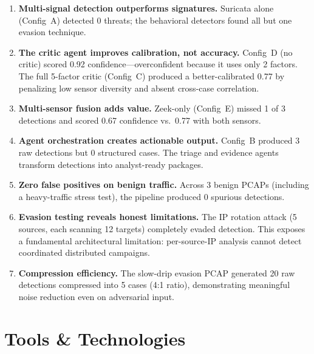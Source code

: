 \documentclass[11pt, a4paper]{article}
\begin{document}
\begin{enumerate}[itemsep=4pt]
    \item \textbf{Multi-signal detection outperforms signatures.}\;
    Suricata alone (Config~A) detected 0 threats; the behavioral detectors found all but one evasion technique.

    \item \textbf{The critic agent improves calibration, not accuracy.}\;
    Config~D (no critic) scored 0.92 confidence---overconfident because it uses only 2 factors. The full 5-factor critic (Config~C) produced a better-calibrated 0.77 by penalizing low sensor diversity and absent cross-case correlation.

    \item \textbf{Multi-sensor fusion adds value.}\;
    Zeek-only (Config~E) missed 1 of 3 detections and scored 0.67 confidence vs.\ 0.77 with both sensors.

    \item \textbf{Agent orchestration creates actionable output.}\;
    Config~B produced 3 raw detections but 0 structured cases. The triage and evidence agents transform detections into analyst-ready packages.

    \item \textbf{Zero false positives on benign traffic.}\;
    Across 3 benign PCAPs (including a heavy-traffic stress test), the pipeline produced 0 spurious detections.

    \item \textbf{Evasion testing reveals honest limitations.}\;
    The IP rotation attack (5 sources, each scanning 12 targets) completely evaded detection. This exposes a fundamental architectural limitation: per-source-IP analysis cannot detect coordinated distributed campaigns.

    \item \textbf{Compression efficiency.}\;
    The slow-drip evasion PCAP generated 20 raw detections compressed into 5 cases (4:1 ratio), demonstrating meaningful noise reduction even on adversarial input.
\end{enumerate}

\section{Tools \& Technologies}
\end{document}
